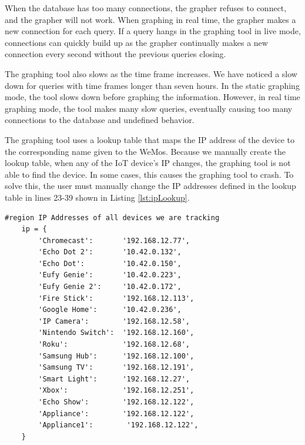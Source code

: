 When the database has too many connections, the grapher refuses to connect, and the grapher will not work. When graphing in real time, the grapher makes a new connection for each query. If a query hangs in the graphing tool in live mode, connections can quickly build up as the grapher continually makes a new connection every second without the previous queries closing.

The graphing tool also slows as the time frame increases. We have noticed a slow down for queries with time frames longer than seven hours. In the static graphing mode, the tool slows down before graphing the information. However, in real time graphing mode, the tool makes many slow queries, eventually causing too many connections to the database and undefined behavior.

The graphing tool uses a lookup table that maps the IP address of the device to the corresponding name given to the WeMos. Because we manually create the lookup table, when any of the IoT device's IP changes, the graphing tool is not able to find the device. In some cases, this causes the graphing tool to crash. To solve this, the user must manually change the IP addresses defined in the lookup table in lines 23-39 shown in Listing \ref{lst:ipLookup}.

\begin{minipage}{\textwidth}
    \begin{lstlisting}[label={lst:ipLookup},caption={IP lookup table in real time IoT grapher.}]
    #region IP Addresses of all devices we are tracking
    ip = {
        'Chromecast':       '192.168.12.77',
        'Echo Dot 2':       '10.42.0.132',
        'Echo Dot':         '10.42.0.150',
        'Eufy Genie':       '10.42.0.223',
        'Eufy Genie 2':     '10.42.0.172',
        'Fire Stick':       '192.168.12.113',
        'Google Home':      '10.42.0.236',
        'IP Camera':        '192.168.12.58',
        'Nintendo Switch':  '192.168.12.160',
        'Roku':             '192.168.12.68',
        'Samsung Hub':      '192.168.12.100',
        'Samsung TV':       '192.168.12.191',
        'Smart Light':      '192.168.12.27',
        'Xbox':             '192.168.12.251',
        'Echo Show':        '192.168.12.122',
        'Appliance':        '192.168.12.122',
        'Appliance1':        '192.168.12.122',
    }
    \end{lstlisting}
\end{minipage}
